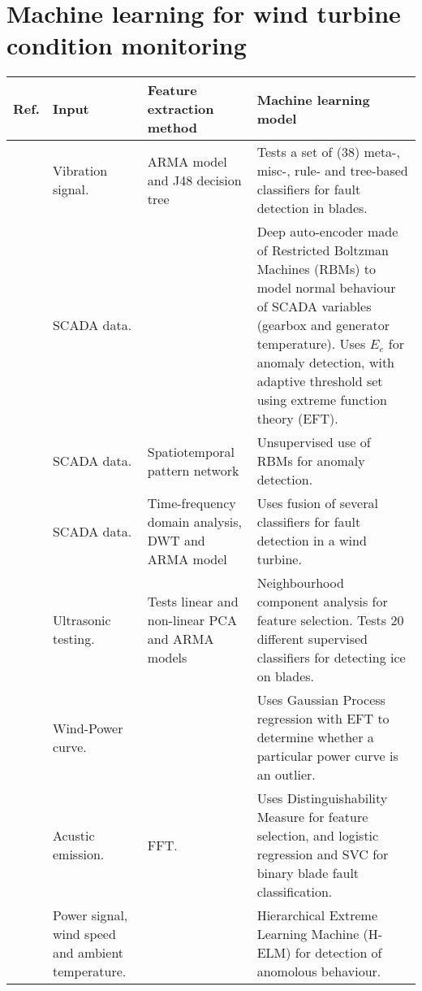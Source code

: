 \section{Machine learning for wind turbine condition monitoring}

\begin{longtable}{p{}p{}p{}p{}}
    \hline
    Ref. & Input & Feature extraction method & Machine learning model \\
    \hline \hline
    \cite{ml_cm_wt_blade_ARMA_2018} & Vibration signal. & ARMA model and J48 decision tree & Tests a set of (38) meta-, misc-, rule- and tree-based classifiers for fault detection in blades. \\  \hline
    \cite{AD_and_fault_analysis_wt_DAE} & SCADA data. & & Deep auto-encoder made of Restricted Boltzman Machines (RBMs) to model normal behaviour of SCADA variables (gearbox and generator temperature). Uses $E_e$ for anomaly detection, with adaptive threshold set using extreme function theory (EFT). \\ \hline
    \cite{unsup_graphical_modeling_wt_cm} & SCADA data. & Spatiotemporal pattern network & Unsupervised use of RBMs for anomaly detection. \\ \hline
    \cite{fault_detection_and_isolation_using_classifier_fusion} & SCADA data. & Time-frequency domain analysis, DWT and ARMA model & Uses fusion of several classifiers for fault detection in a wind turbine.  \\ \hline
    \cite{lin_and_non_lin_feat_for_ice_detection_on_blades} & Ultrasonic testing. & Tests linear and non-linear PCA and ARMA models & Neighbourhood component analysis for feature selection. Tests 20 different supervised classifiers for detecting ice on blades. \\ \hline
    \cite{perf_mon_of_wt_using_extreme_func_theory} & Wind-Power curve. &  & Uses Gaussian Process regression with EFT to determine whether a particular power curve is an outlier.\\ \hline
    \cite{blade_damage_detection_sup_ml_alg} & Acustic emission. & FFT. & Uses Distinguishability Measure for feature selection, and logistic regression and SVC for binary blade fault classification. \\ \hline
    \cite{wt_cm_using_cloud_computing_and_HELM} & Power signal, wind speed and ambient temperature. & & Hierarchical Extreme Learning Machine (H-ELM) for detection of anomolous behaviour. \\ \hline

\end{longtable}
